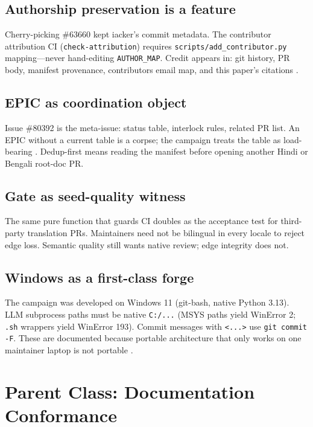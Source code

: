 \documentclass[11pt]{article}
\theoremstyle{definition}
\theoremstyle{plain}
\theoremstyle{remark}
\begin{document}
\subsection{Authorship preservation is a feature}

Cherry-picking \#63660 kept iacker's commit metadata. The contributor
attribution CI (\texttt{check-attribution}) requires
\texttt{scripts/add\_contributor.py} mapping---never hand-editing
\texttt{AUTHOR\_MAP}. Credit appears in: git history, PR body, manifest
provenance, contributors email map, and this paper's citations
\citep{hermespr80391,docsgermskill}.

\subsection{EPIC as coordination object}

Issue \#80392 is the meta-issue: status table, interlock rules, related PR
list. An EPIC without a current table is a corpse; the campaign treats the
table as load-bearing \citep{hermesepic80392}. Dedup-first means reading the
manifest before opening another Hindi or Bengali root-doc PR.

\subsection{Gate as seed-quality witness}

The same pure function that guards CI doubles as the acceptance test for
third-party translation PRs. Maintainers need not be bilingual in every
locale to reject edge loss. Semantic quality still wants native review; edge
integrity does not.

\subsection{Windows as a first-class forge}

The campaign was developed on Windows 11 (git-bash, native Python 3.13). LLM
subprocess paths must be native \texttt{C:/...} (MSYS paths yield WinError 2;
\texttt{.sh} wrappers yield WinError 193). Commit messages with \texttt{<...>}
use \texttt{git commit -F}. These are documented because portable
architecture that only works on one maintainer laptop is not portable
\citep{docsgermskill}.


\section{Parent Class: Documentation Conformance}
\label{sec:parent}
\end{document}
